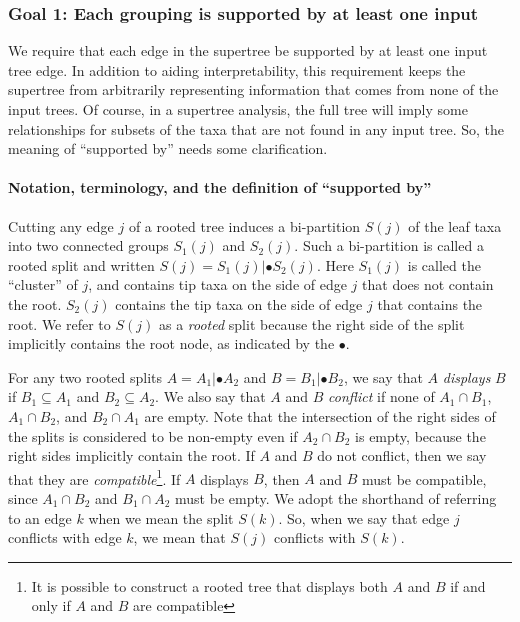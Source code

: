 \documentclass[fleqn,12pt,lineno,english]{wlpeerj}
\begin{document}
\subsubsection{Goal 1: Each grouping is supported by at least one input}

We require that each edge in the supertree be supported by at least
one input tree edge. In addition to aiding interpretability, this
requirement keeps the supertree from arbitrarily representing information
that comes from none of the input trees. Of course, in a supertree
analysis, the full tree will imply some relationships for subsets
of the taxa that are not found in any input tree. So, the meaning
of ``supported by'' needs some clarification. 

\paragraph*{Notation, terminology, and the definition of ``supported by''}

Cutting any edge \textbf{$j$ }of a rooted tree induces a bi-partition
$S(j)$ of the leaf taxa into two connected groups $S_{1}(j)$ and
$S_{2}(j)$. Such a bi-partition is called a rooted split and written
$S(j)=S_{1}(j)|\bullet S_{2}(j)$. Here $S_{1}(j)$ is called the ``cluster'' of $j$, and contains tip taxa on the side of edge $j$ that does not contain the
root. $S_{2}(j)$ contains the tip taxa on the side of edge $j$ that
contains the root. We refer to $S(j)$ as a \emph{rooted} split because
the right side of the split implicitly contains the root node, as indicated
by the $\bullet$.

For any two rooted splits $A=A_{1}|\bullet A_{2}$ and $B=B_{1}|\bullet B_{2}$,
we say that $A$ \emph{displays} $B$ if $B_{1}\subseteq A_{1}$ and
$B_{2}\subseteq A_{2}$. We also say that $A$ and $B$ \emph{conflict}
if none of $A_{1}\cap B_{1}$, $A_{1}\cap B_{2}$, and $B_{2}\cap A_{1}$
are empty.
Note that the intersection of the right sides of the splits is considered to
be non-empty even if $A_{2}\cap B_{2}$ is empty, because the right
sides implicitly contain the root. If $A$ and $B$ do not conflict, then we say that they are \emph{compatible}\footnote{It is possible to construct a rooted tree that displays both $A$
and $B$ if and only if $A$ and $B$ are compatible}. If $A$ displays $B$, then $A$ and $B$ must be compatible, since
$A_{1}\cap B_{2}$ and $B_{1}\cap A_{2}$ must be empty. We adopt
the shorthand of referring to an edge $k$ when we mean the split
$S(k)$. So, when we say that edge $j$ conflicts with edge $k$,
we mean that $S(j)$ conflicts with $S(k)$. 
\end{document}
